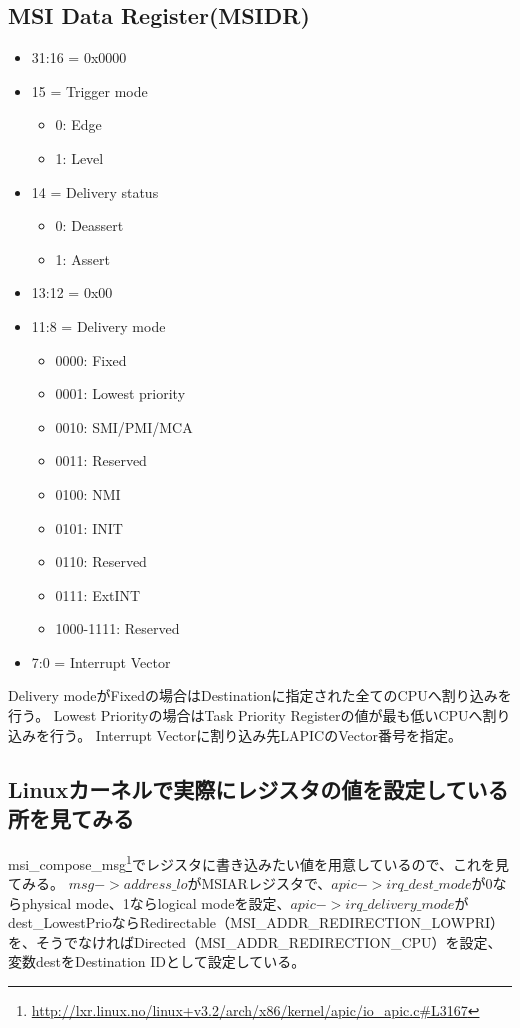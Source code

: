 \subsection{MSI Data Register(MSIDR)}
\begin{itemize}
\item 31:16 = 0x0000
\item 15 = Trigger mode
\begin{itemize}
\item 0: Edge
\item 1: Level
\end{itemize}
\item 14 = Delivery status
\begin{itemize}
\item 0: Deassert
\item 1: Assert
\end{itemize}
\item 13:12 = 0x00
\item 11:8 = Delivery mode
\begin{itemize}
\item 0000: Fixed
\item 0001: Lowest priority
\item 0010: SMI/PMI/MCA
\item 0011: Reserved
\item 0100: NMI
\item 0101: INIT
\item 0110: Reserved
\item 0111: ExtINT
\item 1000-1111: Reserved
\end{itemize}
\item 7:0 = Interrupt Vector
\end{itemize}

Delivery modeがFixedの場合はDestinationに指定された全てのCPUへ割り込みを行う。
Lowest Priorityの場合はTask Priority Registerの値が最も低いCPUへ割り込みを行う。
Interrupt Vectorに割り込み先LAPICのVector番号を指定。

\subsection{Linuxカーネルで実際にレジスタの値を設定している所を見てみる}

msi\_compose\_msg\footnote{\url{http://lxr.linux.no/linux+v3.2/arch/x86/kernel/apic/io\_apic.c\#L3167}}でレジスタに書き込みたい値を用意しているので、これを見てみる。
$msg->address\_lo$がMSIARレジスタで、$apic->irq\_dest\_mode$が0ならphysical mode、1ならlogical modeを設定、$apic->irq\_delivery\_mode$がdest\_LowestPrioならRedirectable（MSI\_ADDR\_REDIRECTION\_LOWPRI）を、そうでなければDirected（MSI\_ADDR\_REDIRECTION\_CPU）を設定、変数destをDestination IDとして設定している。

